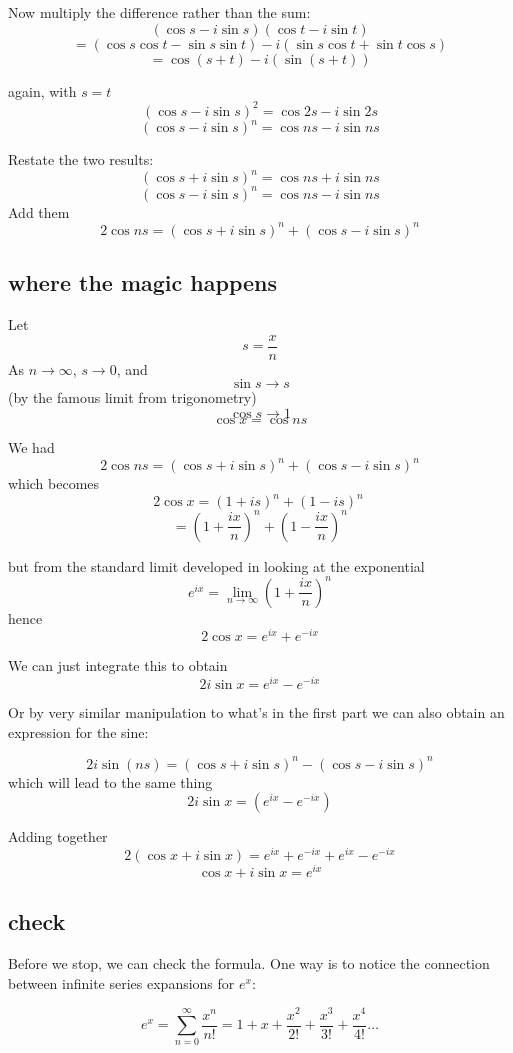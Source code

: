 \documentclass[11pt, oneside]{article}
\begin{document}
Now multiply the difference rather than the sum:
\[ (\cos s - i \sin s) (\cos t - i \sin t) \]
\[ = (\cos s \cos t - \sin s \sin t ) - i (\sin s \cos t + \sin t \cos s) \]
\[ = \cos(s+t) - i (\sin (s + t)) \]

again, with $s=t$
\[ ( \cos s - i \sin s)^2 = \cos 2s - i \sin 2s \]
\[ ( \cos s - i \sin s)^n = \cos ns - i \sin ns \]

Restate the two results:
\[ (\cos s + i \sin s)^n = \cos ns  + i \sin ns \]
\[ ( \cos s - i \sin s)^n = \cos ns - i \sin ns \]
Add them
\[ 2 \cos ns = (\cos s + i \sin s)^n + ( \cos s - i \sin s)^n \]

\subsection*{where the magic happens}
Let 
\[ s = \frac{x}{n} \]
As $n \rightarrow \infty$, $s \rightarrow 0$, and 
\[ \sin s \rightarrow s \] 
(by the famous limit from trigonometry)
\[ \cos s \rightarrow 1\]
\[ \cos x  = \cos ns \]

We had
\[ 2 \cos ns = (\cos s + i \sin s)^n + ( \cos s - i \sin s)^n \]
which becomes
\[ 2 \cos x =  (1 + i s)^n + (1 - i s)^n \  \]
\[ = (1 + \frac{ix}{n})^n + (1 - \frac{ix}{n})^n  \]

but from the standard limit developed in looking at the exponential
\[ e^{ix} = \lim_{n \rightarrow \infty} (1 + \frac{ix}{n})^n \]
hence
\[  2 \cos x  = e^{ix} + e^{-ix}  \]

We can just integrate this to obtain
\[  2i \sin x  = e^{ix} - e^{-ix} \]

Or by very similar manipulation to what's in the first part we can also obtain an expression for the sine:

\[ 2i \sin(ns) = (\cos s + i \sin s)^n - (\cos s - i \sin s)^n  \]
which will lead to the same thing
\[ 2i \sin x =  (e^{ix} - e^{-ix}) \]

Adding together
\[ 2(\cos x + i \sin x) = e^{ix} + e^{-ix} + e^{ix} - e^{-ix} \]
\[ \cos x + i \sin x = e^{ix} \]

\subsection*{check}
Before we stop, we can check the formula.  One way is to notice the connection between infinite series expansions for $e^x$:

\[ e^x = \sum_{n=0}^{\infty} \frac{x^n}{n!}  =  1 + x + \frac{x^2}{2!} + \frac{x^3}{3!} + \frac{x^4}{4!} \dots \]
\end{document}
